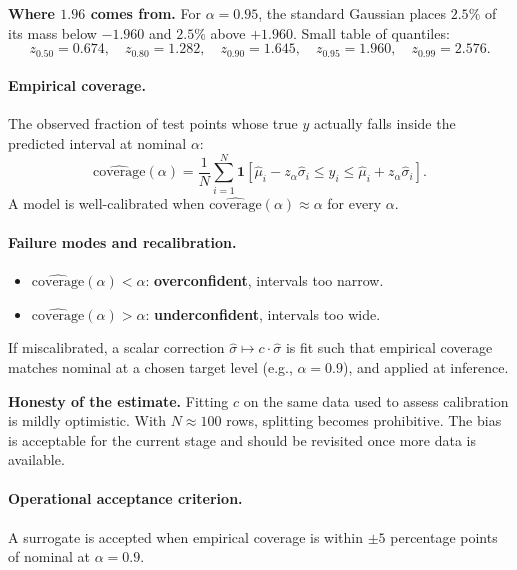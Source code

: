 \documentclass[11pt,a4paper]{article}
\begin{document}
\begin{recapbox}
\textbf{Where $1.96$ comes from.} For $\alpha = 0.95$, the standard Gaussian places $2.5\%$ of its mass below $-1.960$ and $2.5\%$ above $+1.960$. Small table of quantiles:
\[
z_{0.50} = 0.674, \quad z_{0.80} = 1.282, \quad z_{0.90} = 1.645, \quad z_{0.95} = 1.960, \quad z_{0.99} = 2.576.
\]
\end{recapbox}

\paragraph{Empirical coverage.} The observed fraction of test points whose true $y$ actually falls inside the predicted interval at nominal $\alpha$:
\[
\widehat{\text{coverage}}(\alpha) = \frac{1}{N}\sum_{i=1}^N \mathbf{1}\!\left[\hat\mu_i - z_\alpha \hat\sigma_i \leq y_i \leq \hat\mu_i + z_\alpha \hat\sigma_i\right].
\]
A model is well-calibrated when $\widehat{\text{coverage}}(\alpha) \approx \alpha$ for every $\alpha$.

\paragraph{Failure modes and recalibration.}
\begin{itemize}
    \item $\widehat{\text{coverage}}(\alpha) < \alpha$: \textbf{overconfident}, intervals too narrow.
    \item $\widehat{\text{coverage}}(\alpha) > \alpha$: \textbf{underconfident}, intervals too wide.
\end{itemize}
If miscalibrated, a scalar correction $\hat\sigma \mapsto c \cdot \hat\sigma$ is fit such that empirical coverage matches nominal at a chosen target level (e.g., $\alpha = 0.9$), and applied at inference.

\begin{cautionbox}
\textbf{Honesty of the estimate.} Fitting $c$ on the same data used to assess calibration is mildly optimistic. With $N \approx 100$ rows, splitting becomes prohibitive. The bias is acceptable for the current stage and should be revisited once more data is available.
\end{cautionbox}

\paragraph{Operational acceptance criterion.} A surrogate is accepted when empirical coverage is within $\pm 5$ percentage points of nominal at $\alpha = 0.9$.
\end{document}
